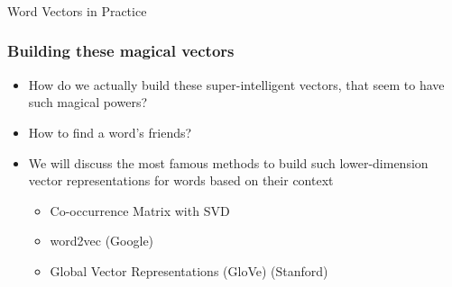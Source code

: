 




\begin{frame}[fragile]\frametitle{}

\begin{center}
{\Large Word Vectors in Practice}
\end{center}
\end{frame}




\begin{frame}[fragile]\frametitle{Building these magical vectors }
\begin{itemize}
\item How do we actually build these super-intelligent vectors, that seem to have such magical powers?
\item How to find a word's friends?
\item We will discuss the most famous methods to build such lower-dimension vector representations for words based on their context
\begin{itemize}
\item Co-occurrence Matrix with SVD
\item word2vec  (Google)
\item Global Vector Representations (GloVe)   (Stanford)
\end{itemize}
\end{itemize}
\end{frame}




